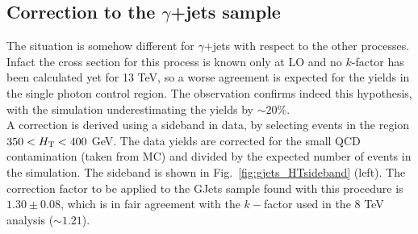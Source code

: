\subsection{Correction to the $\gamma$+jets sample}
\label{sec:sideband_corrections_gjets}
The situation is somehow different for $\gamma$+jets with respect to the other processes. 
Infact the cross section for this process is known only at LO and no $k$-factor has been calculated yet for 13 TeV, 
so a worse agreement is expected for the yields in the single photon control region.
The observation confirms indeed this hypothesis, with the simulation underestimating the yields by $\sim 20\%$. \\
A correction is derived using a sideband in data, by selecting events in the region $350 < \mbox{$H_\text{T}$} < 400$ GeV. 
The data yields are corrected for the small QCD contamination (taken from MC) and divided by the expected number of events in the simulation. 
The sideband is shown in Fig.~\ref{fig:gjets_HTsideband} (left).
The correction factor to be applied to the GJets sample found with this procedure is $1.30 \pm 0.08$, 
which is in fair agreement with the $k-$factor used in the 8 TeV analysis ($\sim 1.21$). 

